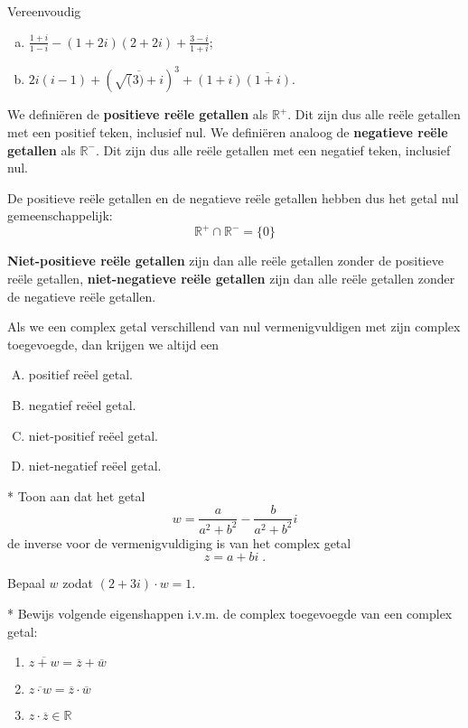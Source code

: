 \documentclass[12pt,twoside]{article}
\begin{document}
\begin{oefening}
  Vereenvoudig
  \begin{enumerate}[(a)]
    \itemsep 1em
  \item $\frac{1+i}{1-i}-(1+2i)(2+2i)+\frac{3-i}{1+i}$;
  \item $2i(i-1)+\left(\overline{\sqrt(3)+i}\right)^3+(1+i)\overline{(1+i)}.$
  \end{enumerate}
\end{oefening}

\begin{oefening}
  We definiëren de {\bf positieve reële getallen} als $\mathbb{R}^+$. Dit zijn dus alle reële getallen met een positief teken, inclusief nul. We definiëren analoog de {\bf negatieve reële getallen} als $\mathbb{R}^-$. Dit zijn dus alle reële getallen met een negatief teken, inclusief nul.

  De positieve reële getallen en de negatieve reële getallen hebben dus het getal nul gemeenschappelijk:
  $$\mathbb{R}^+\cap\mathbb{R}^-=\{0\}$$

  {\bf Niet-positieve reële getallen} zijn dan alle reële getallen zonder de positieve reële getallen, {\bf niet-negatieve reële getallen} zijn dan alle reële getallen zonder de negatieve reële getallen.

  Als we een complex getal verschillend van nul vermenigvuldigen met zijn complex toegevoegde, dan krijgen we altijd een
  \begin{enumerate}[(A)]
  \item positief reëel getal.
  \item negatief reëel getal.
  \item niet-positief reëel getal.
  \item niet-negatief reëel getal.
  \end{enumerate}
\end{oefening}

\begin{oefening}*
Toon aan dat het getal
$$w=\dfrac{a}{a^2+b^2}-\dfrac{b}{a^2+b^2}i$$
de inverse voor de vermenigvuldiging is van het complex getal
$$z=a+bi\;.$$
\end{oefening}

\begin{oefening}
Bepaal $w$ zodat $(2+3i)\cdot w = 1$.
\end{oefening}

\begin{oefening}*
Bewijs volgende eigenshappen i.v.m. de complex toegevoegde van een complex getal:
\begin{enumerate}[a]
  \item $\overline{z+w}=\overline{z}+\overline{w}$
  \item $\overline{z\cdot w}=\overline{z}\cdot\overline{w}$
  \item $z\cdot\overline{z}\in\mathbb{R}$
\end{enumerate}
\end{oefening}
\end{document}
